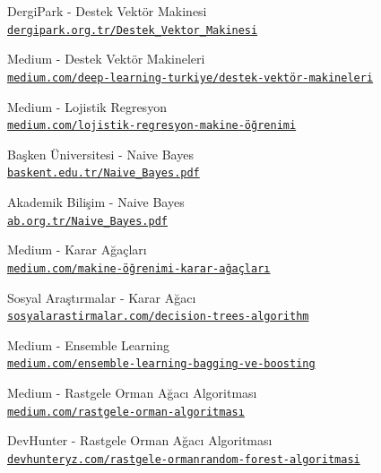 \documentclass[conference]{IEEEtran}
\begin{document}
\begin{thebibliography}{22}
DergiPark - Destek Vektör Makinesi
\\\texttt{\href{https://dergipark.org.tr/tr/download/article-file/65371}{\nolinkurl{dergipark.org.tr/Destek_Vektor_Makinesi}}}

Medium - Destek Vektör Makineleri
\\\texttt{\href{https://medium.com/deep-learning-turkiye/nedir-bu-destek-vektör-makineleri-makine-öğrenmesi-serisi-2-94e576e4223e}{\nolinkurl{medium.com/deep-learning-turkiye/destek-vektör-makineleri}}}

Medium - Lojistik Regresyon
\\\texttt{\href{https://medium.com/@k.ulgen90/lojistik-regresyon-makine-öğrenimi-bölüm-7-c6bc685a4084}{\nolinkurl{medium.com/lojistik-regresyon-makine-öğrenimi}}}

Başken Üniversitesi - Naive Bayes
\\\texttt{\href{https://mail.baskent.edu.tr/~20410964/DM_9.pdf}{\nolinkurl{baskent.edu.tr/Naive_Bayes.pdf}}}

Akademik Bilişim - Naive Bayes
\\\texttt{\href{https://ab.org.tr/ab14/bildiri/186.pdf}{\nolinkurl{ab.org.tr/Naive_Bayes.pdf}}}

Medium - Karar Ağaçları
\\\texttt{\href{https://medium.com/@k.ulgen90/makine-öğrenimi-bölüm-5-karar-ağaçları-c90bd7593010}{\nolinkurl{medium.com/makine-öğrenimi-karar-ağaçları}}}

Sosyal Araştırmalar - Karar Ağacı
\\\texttt{\href{https://www.sosyalarastirmalar.com/articles/text-classification-via-decision-trees-algorithm-customer-comments-case.pdf}{\nolinkurl{sosyalarastirmalar.com/decision-trees-algorithm}}}

Medium - Ensemble Learning
\\\texttt{\href{https://medium.com/deep-learning-turkiye/ensemble-learning-bagging-ve-boosting-50643428b22b}{\nolinkurl{medium.com/ensemble-learning-bagging-ve-boosting}}}

Medium - Rastgele Orman Ağacı Algoritması
\\\texttt{\href{https://medium.com/@cemthecebi/rastgele-orman-algoritması-1600ca4f4784}{\nolinkurl{medium.com/rastgele-orman-algoritması}}}

DevHunter - Rastgele Orman Ağacı Algoritması
\\\texttt{\href{https://devhunteryz.wordpress.com/2018/09/20/rastgele-ormanrandom-forest-algoritmasi/comment-page-1}{\nolinkurl{devhunteryz.com/rastgele-ormanrandom-forest-algoritmasi}}}


\end{thebibliography}
\end{document}
